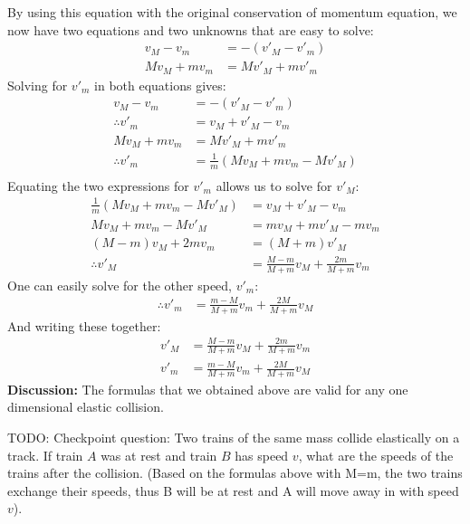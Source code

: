 \begin{example}
By using this equation with the original conservation of momentum equation, we now have two equations and two unknowns that are easy to solve:
\begin{align*}
v_M-v_m &= - (v'_M-v'_m)\\
Mv_M+mv_m&=Mv'_M+mv'_m
\end{align*}
Solving for $v'_m$ in both equations gives:
\begin{align*}
v_M-v_m &= - (v'_M-v'_m)\\
\therefore v'_m &= v_M+v'_M-v_m\\
Mv_M+mv_m&=Mv'_M+mv'_m\\
\therefore v'_m&=\frac{1}{m}(Mv_M+mv_m-Mv'_M)\\
\end{align*}
Equating the two expressions for $v'_m$ allows us to solve for $v'_M$:
\begin{align*}
\frac{1}{m}(Mv_M+mv_m-Mv'_M)&=v_M+v'_M-v_m\\
Mv_M+mv_m-Mv'_M&=mv_M+mv'_M-mv_m\\
(M-m)v_M+2mv_m&=(M+m)v'_M\\
\therefore v'_M&=\frac{M-m}{M+m}v_M+\frac{2m}{M+m}v_m
\end{align*}
One can easily solve for the other speed, $v'_m$:
\begin{align*}
\therefore v'_m &= \frac{m-M}{M+m}v_m+\frac{2M}{M+m}v_M
\end{align*}
And writing these together:
\begin{align*}
v'_M&=\frac{M-m}{M+m}v_M+\frac{2m}{M+m}v_m\\
v'_m &= \frac{m-M}{M+m}v_m+\frac{2M}{M+m}v_M
\end{align*}
\textbf{Discussion:} The formulas that we obtained above are valid for any one dimensional elastic collision. 
\end{example}

TODO: Checkpoint question: Two trains of the same mass collide elastically on a track. If train $A$ was at rest and train $B$ has speed $v$, what are the speeds of the trains after the collision. (Based on the formulas above with M=m, the two trains exchange their speeds, thus B will be at rest and A will move away in with speed $v$).


